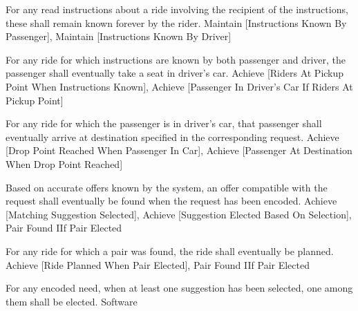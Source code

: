   \startkaosspec
  	 {For any read instructions about a ride involving the recipient of the instructions, these shall remain known forever by the rider.}
  	 {Maintain [Instructions Known By Passenger], Maintain [Instructions Known By Driver]}
  \stopkaosspec
  
  \startkaosspec
  	 {For any ride for which instructions are known by both passenger and driver, the passenger shall eventually take a seat in driver’s car.}
  	 {Achieve [Riders At Pickup Point When Instructions Known], Achieve [Passenger In Driver's Car If Riders At Pickup Point]}
  \stopkaosspec

  \startkaosspec
  	 {For any ride for which the passenger is in driver’s car, that passenger shall eventually arrive at destination specified in the corresponding request.}
  	 {Achieve [Drop Point Reached When Passenger In Car], Achieve [Passenger At Destination When Drop Point Reached]}
  \stopkaosspec
  


    {}
    
  \startkaosspec
  	 {Based on accurate offers known by the system, an offer compatible with the request shall eventually be found when the request has been encoded.}
  	 {Achieve [Matching Suggestion Selected], Achieve [Suggestion Elected Based On Selection], Pair Found IIf Pair Elected}
  \stopkaosspec

  \startkaosspec
  	 {For any ride for which a pair was found, the ride shall eventually be planned.}
  	 {Achieve [Ride Planned When Pair Elected], Pair Found IIf Pair Elected}
  \stopkaosspec

  \startkaosspec
     {For any encoded need, when at least one suggestion has been selected, one among them shall be elected.}
     {Software}
  \stopkaosspec

